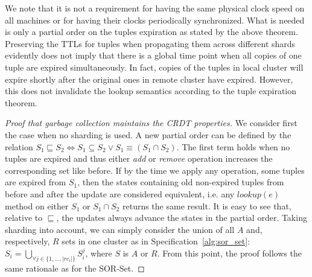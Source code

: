 We note that it is not a requirement for having the same physical clock speed on
all machines or for having their clocks periodically synchronized. What is
needed is only a partial order on the tuples expiration as stated by the above
theorem. Preserving the TTLs for tuples when propagating them across different
shards evidently does not imply that there is a global time point when all
copies of one tuple are expired simultaneously. In fact, copies of the tuples in
local cluster will expire shortly after the original ones in remote cluster have
expired. However, this does not invalidate the lookup semantics according to the
tuple expiration theorem.

\begin{proof}[Proof that garbage collection maintains the CRDT properties]
We consider first the case when no sharding is used. A new partial order can be
defined by the relation $S_{1} \sqsubseteq S_{2} \iff S_{1} \subseteq S_{2} \lor
S_{1} \equiv (S_{1} \cap S_{2})$. The first term holds when no tuples are
expired and thus either \textit{add} or \textit{remove} operation increases the
corresponding set like before. If by the time we apply any operation, some
tuples are expired from $S_{1}$, then the states containing old non-expired
tuples from before and after the update are considered equivalent, i.e. any
$\textit{lookup}(e)$ method on either $S_{1}$ or $S_{1} \cap S_{2}$ returns the
same result. It is easy to see that, relative to $\sqsubseteq$, the updates
always advance the states in the partial order. Taking sharding into account, we
can simply consider the union of all $A$ and, respectively, $R$ sets in one
cluster as in Specification~\ref{alg:sor_set}: $S_{i} = \bigcup_{\forall j \in
\{1,\ldots,|rc_{i}|\}} S_{i}^{j}$, where $S$ is $A$ or $R$. From this point, the
proof follows the same rationale as for the SOR-Set.
\end{proof}